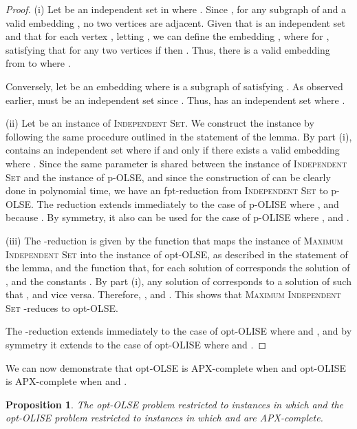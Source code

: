 \documentclass[11pt]{article}
\newtheorem{proposition}[theorem]{Proposition}
\begin{document}
\begin{proof}

(i) Let  be an independent set in  where .  Since , for any subgraph  of  and a valid embedding , no two vertices  are adjacent. Given that  is an independent set and that for each vertex , letting , we can define the embedding , where  for , satisfying that for any two vertices  if  then .  Thus, there is a valid embedding from  to  where .

Conversely, let  be an embedding where  is a subgraph of  satisfying .  As observed earlier,  must be an independent set since . Thus,  has an independent set  where .

(ii) Let  be an instance of \textsc{Independent Set}. We construct the instance \newline  by following the same procedure outlined in the statement of the lemma.  By part (i),  contains an independent set  where  if and only if there exists a valid embedding  where . Since the same parameter is shared between the instance of \textsc{Independent Set} and the instance  of p-OLSE, and since the construction of  can be clearly done in polynomial time, we have an fpt-reduction from \textsc{Independent Set} to p-OLSE. The reduction extends immediately to the case of p-OLISE where ,   and  because .  By symmetry, it also can be used for the case of p-OLISE where ,  and .

(iii) The -reduction is given by the function  that maps the instance  of \textsc{Maximum Independent Set} into the instance  of opt-OLSE, as described in the statement of the lemma, and the function  that, for each solution  of  corresponds the solution  of , and the constants . By part (i), any solution  of  corresponds to a solution  of  such that , and vice versa. Therefore, , and . This shows that \textsc{Maximum Independent Set} -reduces to opt-OLSE.

The -reduction extends immediately to the case of opt-OLISE where  and , and by symmetry it extends to the case of opt-OLISE where  and . \end{proof}

We can now demonstrate that opt-OLSE is APX-complete when  and opt-OLISE is APX-complete when  and .

\begin{proposition}\label{prop:apx-complete}
The opt-OLSE problem restricted to instances in which  and the opt-OLISE problem restricted to instances in which  and  are APX-complete.
\end{proposition}
\end{document}
